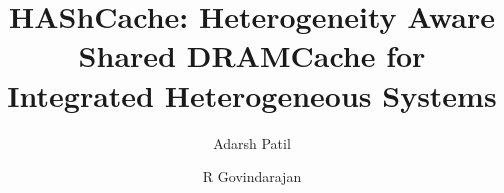 \documentclass[format=acmsmall, review=false, screen=true]{acmart}
\newcommand{\cachename}{HAShCache}
\begin{document}
\title{\cachename: Heterogeneity Aware Shared DRAMCache for Integrated Heterogeneous Systems}
\author{Adarsh Patil}
\author{R Govindarajan}




\maketitle






















\end{document}
